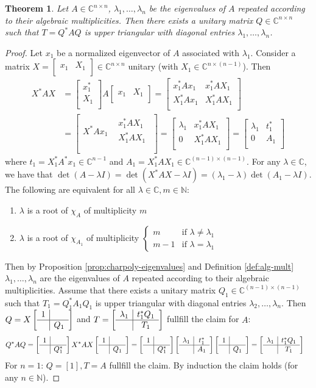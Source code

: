 \documentclass[12pt]{article}
\newcounter{lecture}
\newtheorem{theorem}{Theorem}[lecture]
\theoremstyle{definition}
\theoremstyle{remark}
\numberwithin{equation}{section}
\newcommand{\C}{\mathbb{C}}
\newcommand{\N}{\mathbb{N}}
\newcommand{\blockHorizonatl}[2]{
  \left[
    \begin{array}{c|c}
      #1 & #2 \\
    \end{array}
  \right]
}
\newcommand{\blockVertical}[2]{
  \left[
    \begin{array}{c}
      #1\\\hline
      #2\\
    \end{array}
  \right]
}
\newcommand{\blockFull}[4]{
  \left[
    \begin{array}{c|c}
      #1 & #2\\\hline
      #3 & #4\\
    \end{array}
  \right]
}
\begin{document}
\begin{theorem}
  \label{thm:schur-decomposition}
  Let $A \in \C^{n \times n}$, $\lambda_1,\ldots,\lambda_n$ be the eigenvalues of $A$ repeated according to their algebraic multiplicities. Then there exists a unitary matrix $Q \in \C^{n \times n}$ such that $T = Q^*AQ$ is upper triangular with diagonal entries $\lambda_1,\ldots,\lambda_n$.
\end{theorem}
\begin{proof}
  Let $x_1$ be a normalized eigenvector of $A$ associated with $\lambda_1$. Consider a matrix $X=\blockHorizonatl{x_1}{X_1} \in \C^{n\times n}$ unitary (with $X_1 \in \C^{n \times (n-1)}$). Then
  \begin{align*}
    X^*AX &= \blockVertical{x_1^*}{X_1} A \blockHorizonatl{x_1}{X_1} = \blockFull{x_1^* A x_1}{x_1^* A X_1}{X_1^* A x_1}{X_1^* A X_1}\\
    &=\left[
      \begin{array}{c|c}
        X^*Ax_1 &
        \begin{array}{c}x_1^* A X_1 \\ X_1^* A X_1 \\
        \end{array}\\
    \end{array}\right] = \blockFull{\lambda_1}{x_1^*AX_1}{0}{X_1^*AX_1} = \blockFull{\lambda_1}{t_1^*}{0}{A_1}
  \end{align*}
  where $t_1=X_1^*A^*x_1 \in \C^{n-1}$ and $A_1 = X_1^*AX_1 \in \C^{(n-1)\times(n-1)}$. For any $\lambda \in \C$, we have that $\det(A-\lambda I) = \det(X^*AX - \lambda I) = (\lambda_1 - \lambda) \det(A_1 - \lambda I)$. The following are equivalent for all $\lambda \in \C, m \in \N$:
  \begin{enumerate}[label=(\roman*)]
    \item $\lambda$ is a root of $\chi_A$ of multiplicity $m$
    \item $\lambda$ is a root of $\chi_{A_1}$ of multiplicity $
      \begin{cases}
        m & \text{if } \lambda \neq \lambda_1\\
        m-1 & \text{if } \lambda = \lambda_1
      \end{cases}$
  \end{enumerate}
  Then by Proposition \ref{prop:charpoly-eigenvalues} and Definition \ref{def:alg-mult} $\lambda_1, \ldots, \lambda_n$ are the eigenvalues of $A$ repeated according to their algebraic multiplicities. Assume that there exists a unitary matrix $Q_1 \in \C^{(n-1)\times(n-1)}$ such that $T_1 = Q_1^*A_1Q_1$ is upper triangular with diagonal entries $\lambda_2,\ldots,\lambda_n$. Then $Q = X \blockFull{1}{}{}{Q_1}$ and $T = \blockFull{\lambda_1}{t_1^*Q_1}{}{T_1}$ fullfill the claim for $A$:
  \begin{align*}
    Q^*AQ &= \blockFull{1}{}{}{Q_1^*} X^*AX \blockFull{1}{}{}{Q_1} = \blockFull{1}{}{}{Q_1^*} \blockFull{\lambda_1}{t_1^*}{}{A_1} \blockFull{1}{}{}{Q_1} = \blockFull{\lambda_1}{t_1^*Q_1}{}{T_1}
  \end{align*}
  For $n=1$: $Q=[1], T = A $ fullfill the claim. By induction the claim holds (for any $n\in \N$).
\end{proof}
\end{document}
